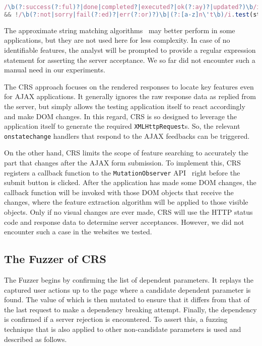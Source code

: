 \documentclass[letter]{sig-alternate-2013}
\begin{document}
\begin{lstlisting}[language=JavaScript,numbers=none]
/\b(?:success(?:ful)?|done|completed?|executed?|ok(?:ay)?|updated?)\b/i.test(string) 
&& !/\b(?:not|sorry|fail(?:ed)?|err(?:or)?)\b|(?:[a-z]n\'t\b)/i.test(string)
\end{lstlisting}
\vspace{+18pt}

\setlength{\parindent}{0in}The approximate string matching algorithms~\cite{approx-string} may better perform in some applications, but they are not used here for less complexity. In case of no identifiable features, the analyst will be prompted to provide a regular expression statement for asserting the server acceptance. We so far did not encounter such a manual need in our experiments.

\setlength{\parindent}{0.2in}The CRS approach focuses on the rendered responses to locate key features even for AJAX applications. It generally ignores the raw response data as replied from the server, but simply allows the testing application itself to react accordingly and make DOM changes. In this regard, CRS is so designed to leverage the application itself to generate the required \verb"XMLHttpRequest"s. So, the relevant \verb"onstatechange" handlers that respond to the AJAX feedbacks can be triggered.

On the other hand, CRS limits the scope of feature searching to accurately the part that changes after the AJAX form submission. To implement this, CRS registers a callback function to the \verb"MutationObserver" API~\cite{mutationobserver} right before the submit button is clicked. After the application has made some DOM changes, the callback function will be invoked with those DOM objects that receive the changes, where the feature extraction algorithm will be applied to those visible objects. Only if no visual changes are ever made, CRS will use the HTTP status code and response data to determine server acceptances. However, we did not encounter such a case in the websites we tested.

\subsection{The Fuzzer of CRS}
The Fuzzer begins by confirming the list of dependent parameters. It replays the captured user actions up to the page where a candidate dependent parameter is found. The value of which is then mutated to ensure that it differs from that of the last request to make a dependency breaking attempt. Finally, the dependency is confirmed if a server rejection is encountered. To assert this, a fuzzing technique that is also applied to other non-candidate parameters is used and described as follows.
\end{document}
